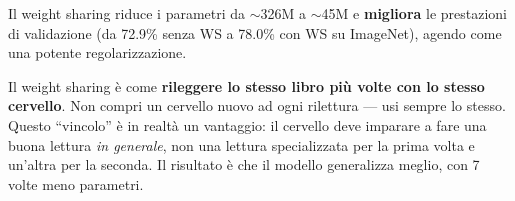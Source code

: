 \documentclass[12pt,a4paper]{article}
\begin{document}
Il weight sharing riduce i parametri da $\sim$326M a $\sim$45M e \textbf{migliora} le prestazioni di validazione (da 72.9\% senza WS a 78.0\% con WS su ImageNet), agendo come una potente regolarizzazione.

\begin{notabox}
Il weight sharing \`e come \textbf{rileggere lo stesso libro pi\`u volte con lo stesso cervello}. Non compri un cervello nuovo ad ogni rilettura --- usi sempre lo stesso. Questo ``vincolo'' \`e in realt\`a un vantaggio: il cervello deve imparare a fare una buona lettura \emph{in generale}, non una lettura specializzata per la prima volta e un'altra per la seconda. Il risultato \`e che il modello generalizza meglio, con 7 volte meno parametri.
\end{notabox}
\end{document}
